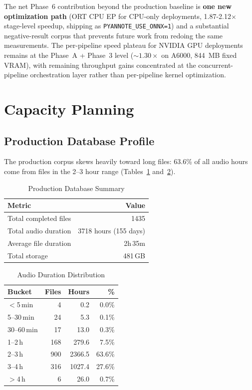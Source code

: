 \documentclass[conference,10pt]{IEEEtran}
\begin{document}
The net Phase~6 contribution beyond the production baseline is
\textbf{one new optimization path} (ORT CPU EP for CPU-only deployments,
1.87-2.12$\times$ stage-level speedup, shipping as \texttt{PYANNOTE\_USE\_ONNX=1})
and a substantial negative-result corpus that prevents future work from
redoing the same measurements. The per-pipeline speed plateau for
NVIDIA GPU deployments remains at the Phase~A + Phase~3 level
($\sim 1.30\times$ on A6000, 844~MB fixed VRAM), with remaining throughput
gains concentrated at the concurrent-pipeline orchestration layer rather
than per-pipeline kernel optimization.

\section{Capacity Planning}

\subsection{Production Database Profile}

The production corpus skews heavily toward long files:
63.6\% of all audio hours come from files in the 2--3 hour range
(Tables~\ref{tab:database} and~\ref{tab:distribution}).

\begin{table}[!t]
\centering
\caption{Production Database Summary}
\label{tab:database}
\begin{tabular}{@{}lr@{}}
\toprule
\textbf{Metric} & \textbf{Value} \\
\midrule
Total completed files   & \num{1435} \\
Total audio duration    & \num{3718} hours (155 days) \\
Average file duration   & 2h\,35m \\
Total storage           & 481\,GB \\
\bottomrule
\end{tabular}
\end{table}

\begin{table}[!t]
\centering
\caption{Audio Duration Distribution}
\label{tab:distribution}
\begin{tabular}{@{}lrrr@{}}
\toprule
\textbf{Bucket} & \textbf{Files} & \textbf{Hours} & \textbf{\%} \\
\midrule
$<$5\,min   &    4 &     0.2 &  0.0\% \\
5--30\,min  &   24 &     5.3 &  0.1\% \\
30--60\,min &   17 &    13.0 &  0.3\% \\
1--2\,h     &  168 &   279.6 &  7.5\% \\
2--3\,h     &  900 & \num{2366.5} & 63.6\% \\
3--4\,h     &  316 & \num{1027.4} & 27.6\% \\
$>$4\,h     &    6 &    26.0 &  0.7\% \\
\bottomrule
\end{tabular}
\end{table}
\end{document}
